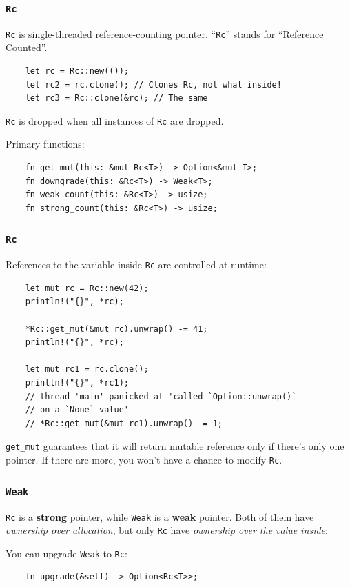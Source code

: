\documentclass[aspectratio=1610,t]{beamer}
\begin{document}
\begin{frame}[fragile]
\frametitle{\texttt{Rc}}
\texttt{Rc} is single-threaded reference-counting pointer. ``\texttt{Rc}'' stands for ``Reference Counted''.

\begin{verbatim}
    let rc = Rc::new(());
    let rc2 = rc.clone(); // Clones Rc, not what inside!
    let rc3 = Rc::clone(&rc); // The same
\end{verbatim}

\texttt{Rc} is dropped when all instances of \texttt{Rc} are dropped.

Primary functions:

\begin{verbatim}
    fn get_mut(this: &mut Rc<T>) -> Option<&mut T>;
    fn downgrade(this: &Rc<T>) -> Weak<T>;
    fn weak_count(this: &Rc<T>) -> usize;
    fn strong_count(this: &Rc<T>) -> usize;
\end{verbatim}
\end{frame}


\begin{frame}[fragile]
\frametitle{\texttt{Rc}}
References to the variable inside \texttt{Rc} are controlled at runtime:

\begin{verbatim}
    let mut rc = Rc::new(42);
    println!("{}", *rc);

    *Rc::get_mut(&mut rc).unwrap() -= 41;
    println!("{}", *rc);

    let mut rc1 = rc.clone();
    println!("{}", *rc1);
    // thread 'main' panicked at 'called `Option::unwrap()`
    // on a `None` value'
    // *Rc::get_mut(&mut rc1).unwrap() -= 1;
\end{verbatim}

\texttt{get\_mut} guarantees that it will return mutable reference only if there's only one pointer. If there are more, you won't have a chance to modify \texttt{Rc}.
\end{frame}


\begin{frame}[fragile]
\frametitle{\texttt{Weak}}
\texttt{Rc} is a \textbf{strong} pointer, while \texttt{Weak} is a \textbf{weak} pointer. Both of them have \textit{ownership over allocation}, but only \texttt{Rc} have \textit{ownership over the value inside}:

You can upgrade \texttt{Weak} to \texttt{Rc}:

\begin{verbatim}
    fn upgrade(&self) -> Option<Rc<T>>;
\end{verbatim}
\end{frame}
\end{document}
